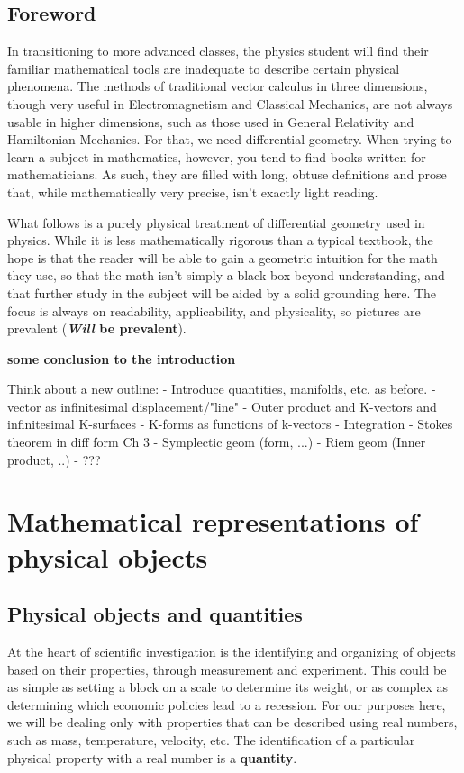 \documentclass{book}
\begin{document}
\section{Foreword}
In transitioning to more advanced classes, the physics student will find their familiar mathematical tools are inadequate to describe certain physical phenomena. The methods of traditional vector calculus in three dimensions, though very useful in Electromagnetism and Classical Mechanics, are not always usable in higher dimensions, such as those used in General Relativity and Hamiltonian Mechanics. For that, we need differential geometry. When trying to learn a subject in mathematics, however, you tend to find books written for mathematicians. As such, they are filled with long, obtuse definitions and prose that, while mathematically very precise, isn't exactly light reading. 

What follows is a purely physical treatment of differential geometry used in physics. While it is less mathematically rigorous than a typical textbook, the hope is that the reader will be able to gain a geometric intuition for the math they use, so that the math isn't simply a black box beyond understanding, and that further study in the subject will be aided by a solid grounding here. The focus is always on readability, applicability, and physicality, so pictures are prevalent (\textbf{\textit{Will} be prevalent}). 

\textbf{some conclusion to the introduction}


\tableofcontents


Think about a new outline: 
- Introduce quantities, manifolds, etc. as before. 
- vector as infinitesimal displacement/"line"
- Outer product and K-vectors and infinitesimal K-surfaces
- K-forms as functions of k-vectors
- Integration
- Stokes theorem in diff form
Ch 3
- Symplectic geom (form, ...)
- Riem geom (Inner product, ..)
- ???



\chapter{Mathematical representations of physical objects}



\section{Physical objects and quantities}

At the heart of scientific investigation is the identifying and organizing of objects based on their properties, through measurement and experiment. This could be as simple as setting a block on a scale to determine its weight, or as complex as determining which economic policies lead to a recession. For our purposes here, we will be dealing only with properties that can be described using real numbers, such as mass, temperature, velocity, etc. The identification of a particular physical property with a real number is a \textbf{quantity}.
\end{document}
